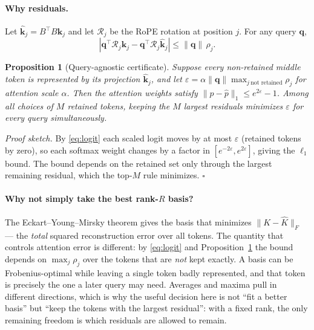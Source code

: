 \documentclass{article}
\newtheorem{proposition}{Proposition}
\begin{document}
\paragraph{Why residuals.}
Let $\hat{\mathbf{k}}_j = B^\top B\mathbf{k}_j$ and let $\mathcal{R}_j$ be the
RoPE rotation at position $j$. For any query $\mathbf{q}$,
\begin{equation}
|\mathbf{q}^\top\mathcal{R}_j\mathbf{k}_j - \mathbf{q}^\top\mathcal{R}_j\hat{\mathbf{k}}_j|
\le \lVert\mathbf{q}\rVert\,\rho_j .
\label{eq:logit}
\end{equation}

\begin{proposition}[Query-agnostic certificate]
\label{prop:cert}
Suppose every non-retained middle token is represented by its projection
$\hat{\mathbf{k}}_j$, and let
$\varepsilon = \alpha\lVert\mathbf{q}\rVert\max_{j\ \text{not retained}}\rho_j$
for attention scale $\alpha$. Then the attention weights satisfy
$\lVert p - \hat p\rVert_1 \le e^{2\varepsilon} - 1$. Among all choices of $M$
retained tokens, keeping the $M$ largest residuals minimizes $\varepsilon$ for
every query simultaneously.
\end{proposition}

\emph{Proof sketch.} By \eqref{eq:logit} each scaled logit moves by at most
$\varepsilon$ (retained tokens by zero), so each softmax weight changes by a
factor in $[e^{-2\varepsilon}, e^{2\varepsilon}]$, giving the $\ell_1$ bound.
The bound depends on the retained set only through the largest remaining
residual, which the top-$M$ rule minimizes. \hfill$\square$

\paragraph{Why not simply take the best rank-$R$ basis?}
The Eckart--Young--Mirsky theorem gives the basis that minimizes
$\lVert K - \hat K\rVert_F$ --- the \emph{total} squared reconstruction error over
all tokens. The quantity that controls attention error is different: by
\eqref{eq:logit} and Proposition~\ref{prop:cert} the bound depends on
$\max_j \rho_j$ over the tokens that are \emph{not} kept exactly. A basis can be
Frobenius-optimal while leaving a single token badly represented, and that token
is precisely the one a later query may need. Averages and maxima pull in
different directions, which is why the useful decision here is not ``fit a better
basis'' but ``keep the tokens with the largest residual'': with a fixed rank, the
only remaining freedom is which residuals are allowed to remain.
\end{document}
